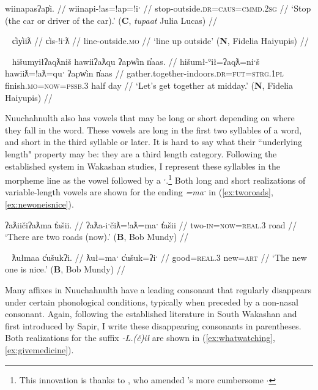 \ex \label{ex:stopoutside}
\begingl
\glpreamble wiinapasʔap̓i. //
\gla wiinapi-!as=!ap=!iˑ //
\glb stop-outside.\textsc{dr}=\textsc{caus}=\textsc{cmmd.2sg} //
\glft `Stop (the car or driver of the car).' (\textbf{C}, \textit{tupaat} Julia Lucas) //
\endgl
\xe

\ex~ \label{ex:lineupoutside}
\begingl
\glpreamble c̓iy̓iiƛ //
\gla c̓is-!iˑƛ //
\glb line-outside.\textsc{mo} //
\glft `line up outside' (\textbf{N}, Fidelia Haiyupis) //
\endgl
\xe

\ex~ \label{ex:gatherindoors}
\begingl
\glpreamble hišumyiłʔaqƛniš hawiiʔaƛqu ʔapw̓in n̓aas. //
\gla hišumł-°ił=ʔaqƛ=niˑš hawiiƛ=!aƛ=quˑ ʔapw̓in n̓aas //
\glb gather.together-indoors.\textsc{dr}=\textsc{fut}=\textsc{strg.1pl} finish.\textsc{mo}=\textsc{now}=\textsc{pssb.3} half day //
\glft `Let's get together at midday.' (\textbf{N}, Fidelia Haiyupis) //
\endgl
\xe

Nuuchahnulth also has vowels that may be long or short depending on where they fall in the word. These vowels are long in the first two syllables of a word, and short in the third syllable or later. It is hard to say what their ``underlying length" property may be: they are a third length category. Following the established system in Wakashan studies, I represent these syllables in the morpheme line as the vowel followed by a ˑ.\footnote{This innovation is thanks to \citealt{rose1981}, who amended \citealt{sapir1939}'s more cumbersome \u{$\cdot$}} Both long and short realizations of variable-length vowels are shown for the ending \textit{=maˑ} in (\ref{ex:tworoads}, \ref{ex:newoneisnice}).

\ex \label{ex:tworoads}
\begingl
\glpreamble ʔaƛiičiʔaƛma t̓ašii. //
\gla ʔaƛa-iˑčiƛ=!aƛ=maˑ t̓ašii //
\glb two-\textsc{in}=\textsc{now}=\textsc{real.3} road //
\glft `There are two roads (now).' (\textbf{B}, Bob Mundy) //
\endgl
\xe

\ex~ \label{ex:newoneisnice}
\begingl
\glpreamble ƛułmaa c̓ušukʔi. //
\gla ƛuł=maˑ c̓ušuk=ʔiˑ //
\glb good=\textsc{real.3} new=\textsc{art} //
\glft `The new one is nice.' (\textbf{B}, Bob Mundy) //
\endgl
\xe

Many affixes in Nuuchahnulth have a leading consonant that regularly disappears under certain phonological conditions, typically when preceded by a non-nasal consonant. Again, following the established literature in South Wakashan and first introduced by Sapir, I write these disappearing consonants in parentheses. Both realizations for the suffix \textit{-L.(č)ił} are shown in (\ref{ex:whatwatching}, \ref{ex:givemedicine}).


